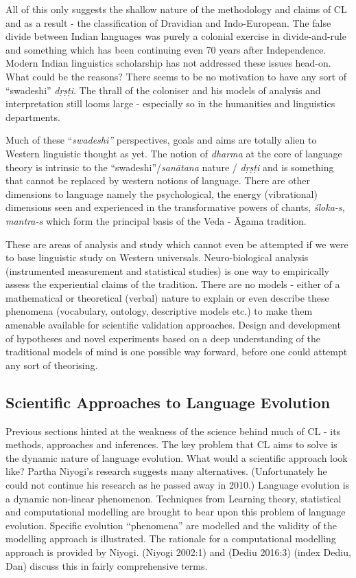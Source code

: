 All of this only suggests the shallow nature of the methodology and claims of CL and as a result - the classification of Dravidian and Indo-European. The false divide between Indian languages was purely a colonial exercise in divide-and-rule and something which has been continuing even 70 years after Independence. Modern Indian linguistics scholarship has not addressed these issues head-on. What could be the reasons? There seems to be no motivation to have any sort of “swadeshi” \textit{dṛṣṭi}. The thrall of the coloniser and his models of analysis and interpretation still looms large - especially so in the humanities and linguistics departments.

Much of these “\textit{swadeshi”} perspectives, goals and aims are totally alien to Western linguistic thought as yet. The notion of \textit{dharma} at the core of language theory is intrinsic to the “swadeshi”/\textit{sanātana} nature / \textit{dṛṣṭi} and is something that cannot be replaced by western notions of language. There are other dimensions to language namely the psychological, the energy (vibrational) dimensions seen and experienced in the transformative powers of chants, \textit{śloka-s, mantra-s} which form the principal basis of the Veda - Āgama tradition.

These are areas of analysis and study which cannot even be attempted if we were to base linguistic study on Western universals. Neuro-biological analysis (instrumented measurement and statistical studies) is one way to empirically assess the experiential claims of the tradition. There are no models - either of a mathematical or theoretical (verbal) nature to explain or even describe these phenomena (vocabulary, ontology, descriptive models etc.) to make them amenable available for scientific validation approaches. Design and development of hypotheses and novel experiments based on a deep understanding of the traditional models of mind is one possible way forward, before one could attempt any sort of theorising.


\subsection*{Scientific Approaches to Language Evolution}

Previous sections hinted at the weakness of the science behind much of CL - its methods, approaches and inferences. The key problem that CL aims to solve is the dynamic nature of language evolution. What would a scientific approach look like? Partha Niyogi’s research suggests many alternatives. (Unfortunately he could not continue his research as he passed away in 2010.) Language evolution is a dynamic non-linear phenomenon. Techniques from Learning theory, statistical and computational modelling are brought to bear upon this problem of language evolution. Specific evolution “phenomena” are modelled and the validity of the modelling approach is illustrated. The rationale for a computational modelling approach is provided by Niyogi. (Niyogi 2002:1) and (Dediu 2016:3) (index Dediu, Dan) discuss this in fairly comprehensive terms.

